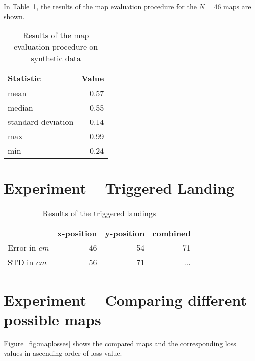 In Table~\ref{tab:mapeval}, the results of the map evaluation
procedure for the $N = 46$ maps are shown.

\begin{table}[h]
  \centering
  \begin{tabular}{lr}
    \toprule
    Statistic & Value\\
    \midrule
    mean & 0.57\\
    median & 0.55\\
    standard deviation & 0.14\\
    max & 0.99\\
    min & 0.24\\    
    \bottomrule
  \end{tabular}
  \caption[Map evaluation procedure on synthetic data]{Results of the map evaluation procedure on synthetic data}
  \label{tab:mapeval}

\end{table}

\section{Experiment -- Triggered Landing}
\label{sec:experiment-4}

\begin{table}[H]
  \centering
  \begin{tabular}{lrrr}
    \toprule
    & x-position & y-position & combined\\
    \midrule
    Error in $cm$ & 46 & 54 & 71\\
    STD in $cm$ & 56 & 71  & ...\\
    \bottomrule
  \end{tabular}
  \caption[Triggered landings]{Results of the triggered landings}
  \label{tab:targetlanding}

\end{table}

\section{Experiment -- Comparing different possible maps}
\label{sec:experiment-6}

Figure~\ref{fig:maplosses} shows the compared maps and the
corresponding loss values in ascending order of loss value.
